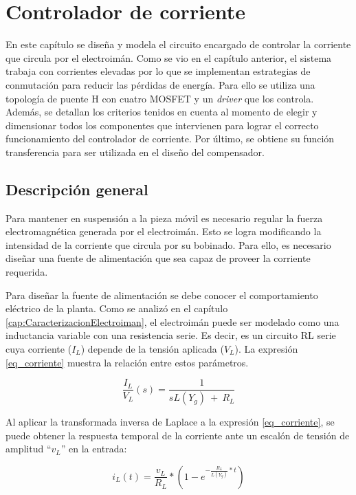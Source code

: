 \chapter{Controlador de corriente}  \label{cap:ControladorCorriente}

En este capítulo se diseña y modela el circuito encargado de controlar la corriente que circula por el electroimán. Como se vio en el capítulo anterior, el sistema trabaja con corrientes elevadas por lo que se implementan estrategias de conmutación para reducir las pérdidas de energía. Para ello se utiliza una topología de puente H con cuatro MOSFET y un \textsl{driver} que los controla. Además, se detallan los criterios tenidos en cuenta al momento de  elegir  y dimensionar todos los componentes que intervienen para lograr el correcto funcionamiento del controlador de corriente. Por último, se obtiene su función transferencia  para ser utilizada en el diseño del compensador.

\section{Descripción general}

Para mantener en suspensión a la pieza móvil es necesario regular la fuerza electromagnética generada por el electroimán. Esto se logra modificando la intensidad de la corriente que circula por su bobinado. Para ello, es necesario diseñar una fuente de alimentación que sea capaz de proveer la corriente requerida.

Para diseñar la fuente de alimentación se debe conocer el comportamiento eléctrico de la planta. Como se analizó en el capítulo \ref{cap:CaracterizacionElectroiman}, el electroimán puede ser modelado como una inductancia variable con una resistencia serie. Es decir, es un circuito RL serie cuya corriente ($I_L$) depende de la tensión aplicada ($V_L$). La expresión \ref{eq_corriente} muestra la relación entre estos parámetros.

\begin{equation} \label{eq_corriente}
\frac{I_L}{V_L}(s)=\frac{1}{sL(Y_g)\ +\ R_L}
\end{equation}

Al aplicar la transformada inversa de Laplace a la expresión  \ref{eq_corriente}, se puede obtener la respuesta temporal de la corriente ante un escalón de tensión de amplitud ``$v_L$'' en la entrada:

\begin{equation} \label{eq_corriente_temporal}
	i_L(t)=\frac{v_L}{R_L}*(1-e^{-\frac{R_L}{L(Y_g)}*t})
\end{equation}

